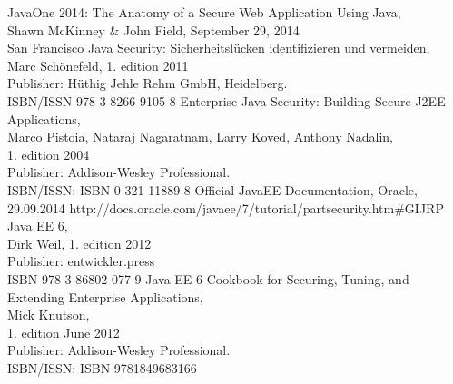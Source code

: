 \documentclass[12pt,a4paper]{report}
\begin{document}
\newpage
\begin{thebibliography}{99}
JavaOne 2014: The Anatomy of a Secure Web Application Using Java, \\
Shawn McKinney \& John Field, September 29, 2014\\
San Francisco
Java Security: Sicherheitslücken identifizieren und vermeiden, \\
Marc Schönefeld, 1. edition 2011\\
Publisher: Hüthig Jehle Rehm GmbH, Heidelberg. \\
ISBN/ISSN 978-3-8266-9105-8
Enterprise Java Security: Building Secure J2EE Applications,\\
Marco Pistoia, Nataraj Nagaratnam, Larry Koved, Anthony Nadalin,\\
1. edition 2004 \\
Publisher: Addison-Wesley Professional.\\
ISBN/ISSN: ISBN 0-321-11889-8
Official JavaEE Documentation, Oracle,\\
29.09.2014
http://docs.oracle.com/javaee/7/tutorial/partsecurity.htm\#GIJRP
Java EE 6,\\
Dirk Weil, 1. edition 2012\\
Publisher: entwickler.press\\
ISBN 978-3-86802-077-9
Java EE 6 Cookbook for Securing, Tuning, and Extending Enterprise Applications,\\
Mick Knutson,\\
1. edition June 2012 \\
Publisher: Addison-Wesley Professional.\\
ISBN/ISSN: ISBN 9781849683166
\end{thebibliography}
\end{document}
